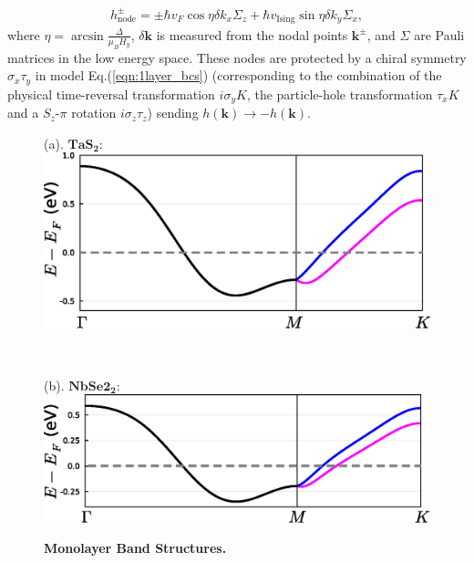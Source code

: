 \begin{align}
    h^{\pm}_{\text{node}}=\pm\hbar v_F \cos\eta \delta k_x\Sigma_z+\hbar v_{\text{Ising}}\sin\eta \delta k_y\Sigma_x,\label{eqn:1layer_eff}
\end{align}
where $\eta=\arcsin\frac{\Delta}{\mu_B H_y}$, $\delta \bm k$ is measured from the nodal points $\bm k^{\pm}$, and $\Sigma$ are Pauli matrices in the low energy space. These nodes are protected by a chiral symmetry $\sigma_x\tau_y$ in model Eq.(\ref{eqn:1layer_bcs}) (corresponding to the combination of the physical time-reversal transformation $i\sigma_yK$, the particle-hole transformation $\tau_x K$ and a $S_z$-$\pi$ rotation $i\sigma_z\tau_z$) sending $h(\bm k)\rightarrow -h(\bm k)$. 
\begin{figure}[!htp]
    \centering
    \begin{minipage}{0.9\linewidth}
        \RaggedRight (a). $\mathbf{TaS_2}$:\\[0.5em]
        \includegraphics[width=\textwidth]{contents/Ising_Top/figures/monolayer_band_Gamma_M_K_TaS2.eps}	
    \end{minipage}
    \\[2em]
    \begin{minipage}{0.9\linewidth}
        \RaggedRight (b). $\mathbf{NbSe2_2}$:\\[0.5em]
        \includegraphics[width=\textwidth]{contents/Ising_Top/figures/monolayer_band_Gamma_M_K_NbSe2.eps}	
    \end{minipage}
    \caption{{\bf Monolayer Band Structures.}}
    \label{fig: band_plot Gamma-M-K}
\end{figure}
